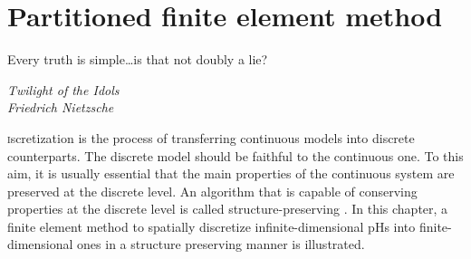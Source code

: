 \chapter{Partitioned finite element method}\label{ch:pfem}

\epigraph{Every truth is simple\dots is that not doubly a lie?}{\textit{Twilight of the Idols \\ Friedrich Nietzsche}}

\minitoc

\lettrine{\color{theme}{D}}iscretization is the process of transferring continuous models into discrete counterparts. The discrete model should be faithful to the continuous one. To this aim, it is usually essential that the main properties of the continuous system are preserved at the discrete level. An algorithm that is capable of conserving properties at the discrete level is called structure-preserving \cite{christiansen2011}. In this chapter, a finite element method to spatially discretize infinite-dimensional pHs into finite-dimensional ones in a structure preserving manner is illustrated.

